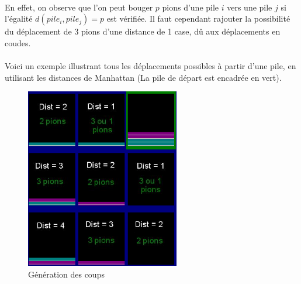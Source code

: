 \documentclass[article, backcover, french, nodocumentinfo]{upmethodology-document}
\begin{document}
				\paragraph{}
					En effet, on observe que l'on peut bouger $p$ pions d'une pile $i$ vers une pile $j$ si l'égalité $d(pile_{i}, pile_{j}) = p$ est vérifiée. Il faut cependant rajouter la possibilité du déplacement de 3 pions d'une distance de 1 case, dû aux déplacements en coudes.
				\paragraph{}
					Voici un exemple illustrant tous les déplacements possibles à partir d'une pile, en utilisant les distances de Manhattan (La pile de départ est encadrée en vert).
					\begin{figure}[H]
						\centering
						\includegraphics[width=0.6\textwidth]{figures/GenerationCoup}
						\caption{Génération des coups}
					\end{figure}
\end{document}
